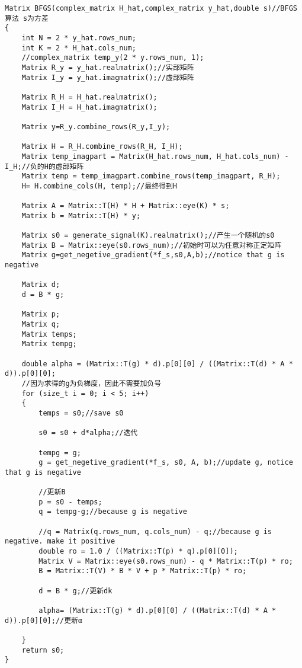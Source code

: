 \documentclass[twocolumn]{ctexart}
\begin{document}
\begin{lstlisting}
Matrix BFGS(complex_matrix H_hat,complex_matrix y_hat,double s)//BFGS算法 s为方差
{
	int N = 2 * y_hat.rows_num;
	int K = 2 * H_hat.cols_num;
	//complex_matrix temp_y(2 * y.rows_num, 1);
	Matrix R_y = y_hat.realmatrix();//实部矩阵
	Matrix I_y = y_hat.imagmatrix();//虚部矩阵

	Matrix R_H = H_hat.realmatrix();
	Matrix I_H = H_hat.imagmatrix();

	Matrix y=R_y.combine_rows(R_y,I_y);

	Matrix H = R_H.combine_rows(R_H, I_H);
	Matrix temp_imagpart = Matrix(H_hat.rows_num, H_hat.cols_num) - I_H;//负的H的虚部矩阵
	Matrix temp = temp_imagpart.combine_rows(temp_imagpart, R_H);
	H= H.combine_cols(H, temp);//最终得到H

	Matrix A = Matrix::T(H) * H + Matrix::eye(K) * s;
	Matrix b = Matrix::T(H) * y;

	Matrix s0 = generate_signal(K).realmatrix();//产生一个随机的s0
	Matrix B = Matrix::eye(s0.rows_num);//初始时可以为任意对称正定矩阵
	Matrix g=get_negetive_gradient(*f_s,s0,A,b);//notice that g is negative 
	
	Matrix d;
	d = B * g;

	Matrix p;
	Matrix q;
	Matrix temps;
	Matrix tempg;
	
	double alpha = (Matrix::T(g) * d).p[0][0] / ((Matrix::T(d) * A * d)).p[0][0];
	//因为求得的g为负梯度，因此不需要加负号
	for (size_t i = 0; i < 5; i++)
	{
		temps = s0;//save s0

		s0 = s0 + d*alpha;//迭代

		tempg = g;
		g = get_negetive_gradient(*f_s, s0, A, b);//update g, notice that g is negative

		//更新B
		p = s0 - temps;
		q = tempg-g;//because g is negative

		//q = Matrix(q.rows_num, q.cols_num) - q;//because g is negative. make it positive
		double ro = 1.0 / ((Matrix::T(p) * q).p[0][0]);
		Matrix V = Matrix::eye(s0.rows_num) - q * Matrix::T(p) * ro;
		B = Matrix::T(V) * B * V + p * Matrix::T(p) * ro;

		d = B * g;//更新dk

		alpha= (Matrix::T(g) * d).p[0][0] / ((Matrix::T(d) * A * d)).p[0][0];//更新α
			
	}
	return s0;
}
\end{lstlisting}
\end{document}
